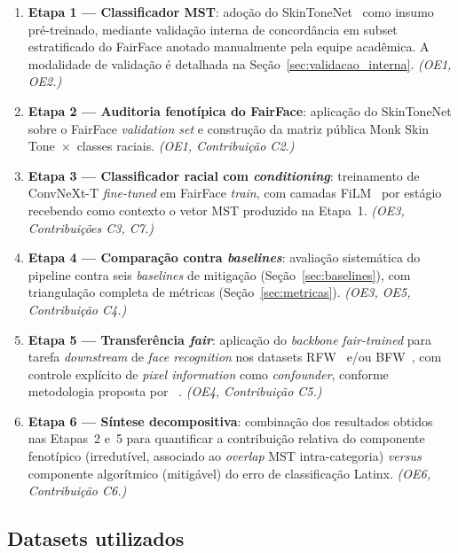 \begin{enumerate}
\item \textbf{Etapa 1 --- Classificador MST}: adoção do SkinToneNet~\autocite{matias2026large} como insumo pré-treinado, mediante validação interna de concordância em subset estratificado do FairFace anotado manualmente pela equipe acadêmica. A modalidade de validação é detalhada na Seção~\ref{sec:validacao_interna}. \textit{(OE1, OE2.)}

\item \textbf{Etapa 2 --- Auditoria fenotípica do FairFace}: aplicação do SkinToneNet sobre o FairFace \emph{validation set} e construção da matriz pública Monk Skin Tone~$\times$~classes raciais. \textit{(OE1, Contribuição C2.)}

\item \textbf{Etapa 3 --- Classificador racial com \emph{conditioning}}: treinamento de ConvNeXt-T \emph{fine-tuned} em FairFace \emph{train}, com camadas FiLM~\autocite{perez2018film} por estágio recebendo como contexto o vetor MST produzido na Etapa~1. \textit{(OE3, Contribuições C3, C7.)}

\item \textbf{Etapa 4 --- Comparação contra \emph{baselines}}: avaliação sistemática do pipeline contra seis \emph{baselines} de mitigação (Seção~\ref{sec:baselines}), com triangulação completa de métricas (Seção~\ref{sec:metricas}). \textit{(OE3, OE5, Contribuição C4.)}

\item \textbf{Etapa 5 --- Transferência \emph{fair}}: aplicação do \emph{backbone} \emph{fair-trained} para tarefa \emph{downstream} de \emph{face recognition} nos datasets RFW~\autocite{wang2019racial} e/ou BFW~\autocite{robinson2020face}, com controle explícito de \emph{pixel information} como \emph{confounder}, conforme metodologia proposta por \citeauthor{pangelinan2023exploring}~\autocite{pangelinan2023exploring}. \textit{(OE4, Contribuição C5.)}

\item \textbf{Etapa 6 --- Síntese decompositiva}: combinação dos resultados obtidos nas Etapas~2 e~5 para quantificar a contribuição relativa do componente fenotípico (irredutível, associado ao \emph{overlap} MST intra-categoria) \emph{versus} componente algorítmico (mitigável) do erro de classificação Latinx. \textit{(OE6, Contribuição C6.)}
\end{enumerate}

\subsection{Datasets utilizados}
\label{sec:datasets}

